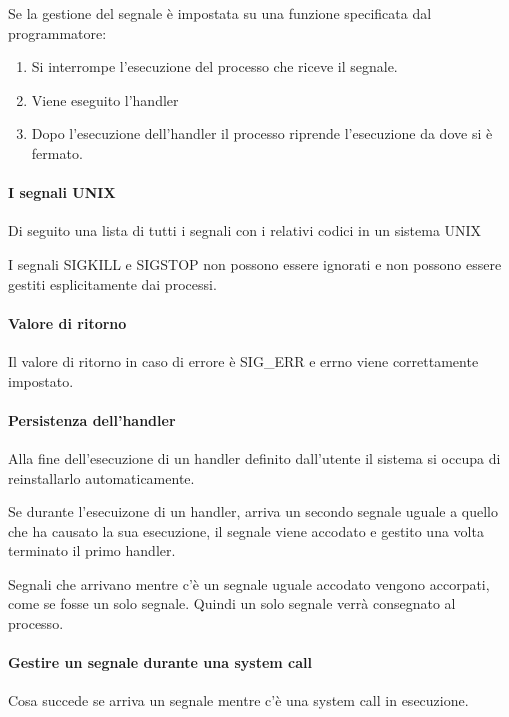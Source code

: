 \documentclass
[10pt,        %
 a4paper,     %
 onecolumn,   %
 fleqn,       %
 oneside,     %
 notitlepage, %
]{article}    %
\begin{document}
Se la gestione del segnale è impostata su una funzione specificata dal programmatore:
\begin{enumerate}
    \item Si interrompe l'esecuzione del processo che riceve il segnale.
    \item Viene eseguito l'handler
    \item Dopo l'esecuzione dell'handler il processo riprende l'esecuzione da dove si è fermato.
\end{enumerate}

\paragraph{I segnali UNIX}
Di seguito una lista di tutti i segnali con i relativi codici in un sistema UNIX




I segnali SIGKILL e SIGSTOP non possono essere ignorati e non possono essere gestiti esplicitamente dai processi.

\paragraph{Valore di ritorno}
Il valore di ritorno in caso di errore è SIG\_ERR e errno viene correttamente impostato.

\paragraph{Persistenza dell'handler}
Alla fine dell'esecuzione di un handler definito dall'utente il sistema si occupa di reinstallarlo automaticamente.

Se durante l'esecuizone di un handler, arriva un secondo segnale uguale a quello che ha causato la sua esecuzione, il segnale viene accodato e gestito una volta terminato il primo handler.

Segnali che arrivano mentre c'è un segnale uguale accodato vengono accorpati, come se fosse un solo segnale. Quindi un solo segnale verrà consegnato al processo.


\paragraph{Gestire un segnale durante una system call}
Cosa succede se arriva un segnale mentre c'è una system call in esecuzione.
\end{document}

